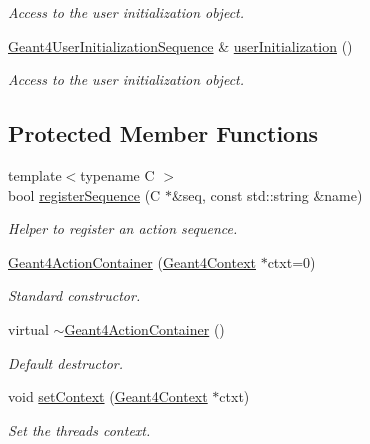 \begin{DoxyCompactItemize}
\begin{DoxyCompactList}\small\item\em Access to the user initialization object. \end{DoxyCompactList}\item 
\hyperlink{class_d_d4hep_1_1_simulation_1_1_geant4_user_initialization_sequence}{Geant4\+User\+Initialization\+Sequence} \& \hyperlink{class_d_d4hep_1_1_simulation_1_1_geant4_action_container_a22b7e6487bab568fec3798fe1e1593f0}{user\+Initialization} ()
\begin{DoxyCompactList}\small\item\em Access to the user initialization object. \end{DoxyCompactList}\end{DoxyCompactItemize}
\subsection*{Protected Member Functions}
\begin{DoxyCompactItemize}
\item 
{\footnotesize template$<$typename C $>$ }\\bool \hyperlink{class_d_d4hep_1_1_simulation_1_1_geant4_action_container_a95c55e436d351d75cf1aaac43aa6cc1b}{register\+Sequence} (C $\ast$\&seq, const std\+::string \&name)
\begin{DoxyCompactList}\small\item\em Helper to register an action sequence. \end{DoxyCompactList}\item 
\hyperlink{class_d_d4hep_1_1_simulation_1_1_geant4_action_container_aad45b121ff08648b1eaf84869ad33da7}{Geant4\+Action\+Container} (\hyperlink{class_d_d4hep_1_1_simulation_1_1_geant4_context}{Geant4\+Context} $\ast$ctxt=0)
\begin{DoxyCompactList}\small\item\em Standard constructor. \end{DoxyCompactList}\item 
virtual \hyperlink{class_d_d4hep_1_1_simulation_1_1_geant4_action_container_ab80f72eb6020b84e6ad03adfe9d7f61e}{$\sim$\+Geant4\+Action\+Container} ()
\begin{DoxyCompactList}\small\item\em Default destructor. \end{DoxyCompactList}\item 
void \hyperlink{class_d_d4hep_1_1_simulation_1_1_geant4_action_container_ae5f4903ca1043137f63f6b9054705b24}{set\+Context} (\hyperlink{class_d_d4hep_1_1_simulation_1_1_geant4_context}{Geant4\+Context} $\ast$ctxt)
\begin{DoxyCompactList}\small\item\em Set the thread\textquotesingle{}s context. \end{DoxyCompactList}\end{DoxyCompactItemize}

